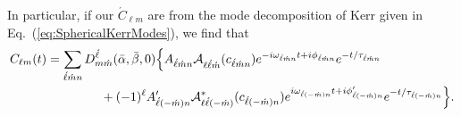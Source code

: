 \documentclass[11pt]{article}
\newcommand{\YSH}[3][]{\mathcal{A}^{#1}_{#2}(#3)}
\begin{document}
In particular, if our $\acute{C}_{\ell m}$ are from the mode decomposition
of Kerr given in Eq.~(\ref{eq:SphericalKerrModes}), we find that
\begin{equation}\label{eq:SphericalRotatedKerrModes}
\begin{aligned}
 C_{\ell{m}}(t) & = \sum_{\acute\ell\acute{m}n}
 D^{\acute\ell}_{m\acute{m}}(\bar\alpha,\bar\beta,0) \Big\{ 
   A_{\acute\ell\acute{m}n}\YSH{\ell\acute\ell\acute{m}}{c_{\acute\ell\acute{m}n}}
    e^{-i\omega_{\acute\ell\acute{m}n}t+i\phi_{\acute\ell\acute{m}n}}e^{-t/\tau_{\acute\ell\acute{m}n}} \\
& {} \hspace{0.6in}
  + (-1)^\ell A^\prime_{\acute\ell(-\acute{m})n}
    \YSH[*]{\ell\acute\ell(-\acute{m})}{c_{\acute\ell(-\acute{m})n}}
    e^{i\omega_{\acute\ell(-\acute{m})n}t+i\phi^\prime_{\acute\ell(-\acute{m})n}}e^{-t/\tau_{\acute\ell(-\acute{m})n}} \Big\}.
\end{aligned}
\end{equation}


\newpage
{}
\vspace{0.25in}
\end{document}
